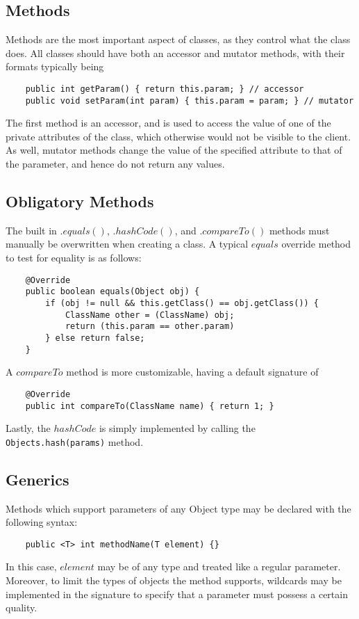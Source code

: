 \documentclass[oneside,11pt]{book}
\begin{document}
\subsection{Methods}

Methods are the most important aspect of classes, as they control what the class does. All classes should have both an accessor and mutator methods, with their formats typically being
\begin{verbatim}
    public int getParam() { return this.param; } // accessor
    public void setParam(int param) { this.param = param; } // mutator
\end{verbatim}
The first method is an accessor, and is used to access the value of one of the private attributes of the class, which otherwise would not be visible to the client. As well, mutator methods change the value of the specified attribute to that of the parameter, and hence do not return any values.

\subsection{Obligatory Methods}
The built in \cverb$.equals()$, \cverb$.hashCode()$, and \cverb$.compareTo()$ methods must manually be overwritten when creating a class. A typical \cverb$equals$ override method to test for equality is as follows:
\begin{verbatim}
    @Override
    public boolean equals(Object obj) {
        if (obj != null && this.getClass() == obj.getClass()) {
            ClassName other = (ClassName) obj;
            return (this.param == other.param)
        } else return false;
    }
\end{verbatim}
A \cverb$compareTo$ method is more customizable, having a default signature of
\begin{verbatim}
    @Override
    public int compareTo(ClassName name) { return 1; }
\end{verbatim}
Lastly, the \cverb$hashCode$ is simply implemented by calling the \texttt{Objects.hash(params)} method.

\subsection{Generics}
Methods which support parameters of any Object type may be declared with the following syntax:
\begin{verbatim}
    public <T> int methodName(T element) {}
\end{verbatim}
In this case, \cverb$element$ may be of any type and treated like a regular parameter. Moreover, to limit the types of objects the method supports, wildcards may be implemented in the signature to specify that a parameter must possess a certain quality.
\end{document}
